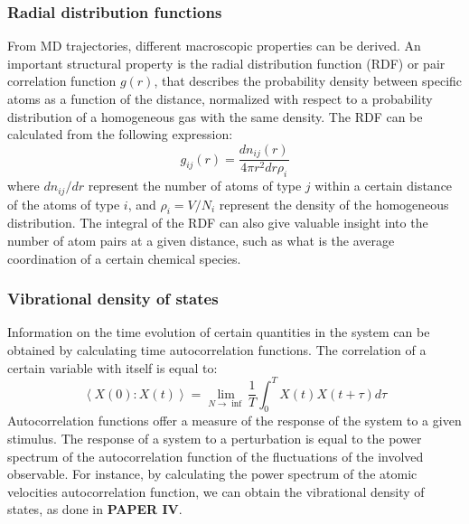 \subsubsection{Radial distribution functions}
From MD trajectories, different macroscopic properties can be derived. An important structural property is the radial distribution function (RDF) or pair correlation function $g(r)$, that describes the probability density between specific atoms as a function of the distance, normalized with respect to a probability distribution of a homogeneous gas with the same density. The RDF can be calculated from the following expression:
\[
g_{ij}(r) = \dfrac{dn_{ij}(r)}{4\pi r^2 dr \rho_i}
\]
where $dn_{ij}/dr$ represent the number of atoms of type $j$ within a certain distance of the atoms of type $i$, and $\rho_i = V / N_i $ represent the density of the homogeneous distribution. The integral of the RDF can also give valuable insight into the number of atom pairs at a given distance, such as what is the average coordination of a certain chemical species.

\subsubsection{Vibrational density of states}
Information on the time evolution of certain quantities in the system can be obtained by calculating time autocorrelation functions. The correlation of a certain variable with itself is equal to:
\[
\left\langle X(0):X(t)\right\rangle = \lim_{N \to \inf} \dfrac{1}{T}\int_{0}^{T}X(t)X(t+\tau)d\tau
\]
Autocorrelation functions offer a measure of the response of the system to a given stimulus. The response of a system to a perturbation is equal to the power spectrum of the autocorrelation function of the fluctuations of the involved observable\cite{kubo1957statistical}. For instance, by calculating the power spectrum of the atomic velocities autocorrelation function, we can obtain the vibrational density of states, as done in \textbf{PAPER IV}. 

